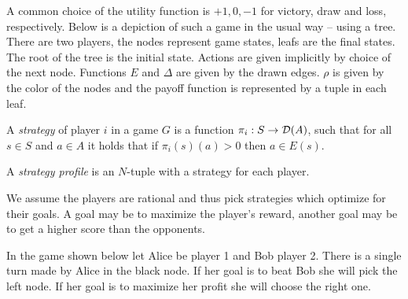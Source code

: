 \begin{example}
A common choice of the utility function is $+1, 0, -1$ for victory, draw
and loss, respectively. Below is a depiction of such a game
in the usual way -- using a tree.
There are two players,
the nodes represent game states, leafs are the final states.
The root of the tree is the initial state.
Actions are given implicitly by choice of the next node.
Functions $E$ and $\Delta$ are given by the drawn edges.
$\rho$ is given by the color of the nodes
and the payoff function is represented by a tuple in each leaf.

\begin{center}
\end{center}
\end{example}


\begin{definition}
    A {\em strategy} of player $i$ in a game $G$ is a function
    $\pi_i : S \to \mathcal{D}(A)$, such that for all $s \in S$ and $a
    \in A$ it holds that if $\pi_i(s)(a) > 0$ then $a \in E(s)$.

    A {\em strategy profile} is an $N$-tuple with a strategy for each player.
\end{definition}

We assume the players are rational and thus pick strategies which
optimize for their goals. A goal may be to maximize the player's reward,
another goal may be to get a higher score than the opponents.

\begin{example}
    In the game shown below let Alice be player 1 and Bob player 2.
    There is a single turn made by Alice in the black node.
If her goal is to beat Bob she will pick the left node.
If her goal is to maximize her profit she will choose the right one.

\begin{center}
\end{center}
\end{example}

